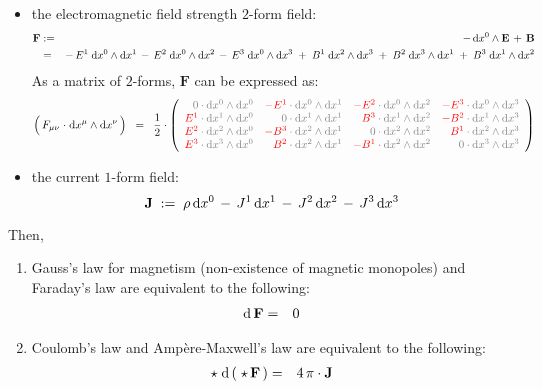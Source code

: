 \begin{theorem}
\begin{itemize}
\item
	the electromagnetic field strength $2$-form field:
	\begin{eqnarray*}
	\mathbf{F}
	& := &
		- \, \textnormal{d} x^{0} \wedge \mathbf{E} \, + \, \mathbf{B}
	\\
	& = &
		- \, E^{1}\;\textnormal{d} x^{0} \wedge \textnormal{d} x^{1} \, - \, E^{2}\;\textnormal{d} x^{0} \wedge \textnormal{d} x^{2} \, - \, E^{3}\;\textnormal{d} x^{0} \wedge \textnormal{d} x^{3}
		\;+\;
		B^{1}\;\textnormal{d} x^{2} \wedge \textnormal{d} x^{3}
		\;+\;
		B^{2}\;\textnormal{d} x^{3} \wedge \textnormal{d} x^{1}
		\;+\;
		B^{3}\;\textnormal{d} x^{1} \wedge \textnormal{d} x^{2}
	\end{eqnarray*}
	As a matrix of $2$-forms, $\mathbf{F}$ can be expressed as:
	\begin{equation*}
	\left(\,F_{\mu\nu}\overset{{\color{white}1}}{\cdot}\d x^{\mu} \wedge \d x^{\nu}\,\right)
	\;\; = \;\;
	\dfrac{1}{2}\cdot
	\left({\color{gray}\begin{array}{rrrr}
	0\cdot\d x^{0}\wedge\d x^{0} &
	{\color{red}-E^{1}} \cdot\d x^{0}\wedge\d x^{1} &
	{\color{red}-E^{2}} \cdot\d x^{0}\wedge\d x^{2} &
	{\color{red}-E^{3}} \cdot\d x^{0}\wedge\d x^{3}
	\\
	{\color{red}E^{1}} \cdot\d x^{1}\wedge\d x^{0} &
	0 \cdot\d x^{1}\wedge\d x^{1} &
	{\color{red}B^{3}} \cdot\d x^{1}\wedge\d x^{2} &
	{\color{red}-B^{2}} \cdot\d x^{1}\wedge\d x^{3}
	\\
	{\color{red}E^{2}} \cdot\d x^{2}\wedge\d x^{0} &
	{\color{red}-B^{3}} \cdot\d x^{2}\wedge\d x^{1} &
	0 \cdot\d x^{2}\wedge\d x^{2} &
	{\color{red}B^{1}} \cdot\d x^{2}\wedge\d x^{3}
	\\
	{\color{red}E^{3}} \cdot\d x^{3}\wedge\d x^{0} &
	{\color{red}B^{2}} \cdot\d x^{2}\wedge\d x^{1} &
	{\color{red}-B^{1}} \cdot\d x^{2}\wedge\d x^{2} &
	0 \cdot\d x^{3}\wedge\d x^{3}
	\end{array}}\right)
	\end{equation*}
\item
	the current $1$-form field:
	\begin{equation*}
	\mathbf{J} \; := \; \rho \, \textnormal{d} x^{0} \,-\, J^{1}\,\textnormal{d} x^{1} \,-\, J^{2}\,\textnormal{d} x^{2} \,-\, J^{3}\,\textnormal{d} x^{3}
	\end{equation*}
\end{itemize}
Then,
\begin{enumerate}
\item
	Gauss's law for magnetism (non-existence of magnetic monopoles) and Faraday's law are equivalent to the following:
	\begin{eqnarray*}
	\textnormal{d}\,\mathbf{F} & = & 0
	\end{eqnarray*}
\item
	Coulomb's law and Amp\`{e}re-Maxwell's law are equivalent to the following:
	\begin{eqnarray*}
	\star\;\textnormal{d} \left(\;\star\,\mathbf{F}\,\right) & = & 4\,\pi\cdot\mathbf{J}
	\end{eqnarray*}	
\end{enumerate}
\end{theorem}
\proof

